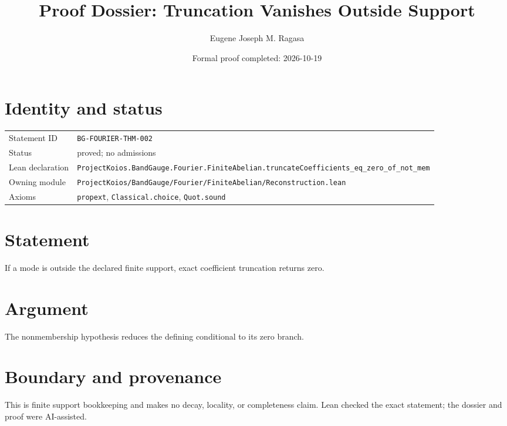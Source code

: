 \documentclass[11pt]{article}
\title{Proof Dossier: Truncation Vanishes Outside Support}
\author{Eugene Joseph M. Ragasa}
\date{Formal proof completed: 2026-10-19}
\begin{document}
\maketitle
\section{Identity and status}
\begin{tabularx}{\textwidth}{@{}lX@{}}\toprule
Statement ID & \texttt{BG-FOURIER-THM-002} \\
Status & proved; no admissions \\
Lean declaration & \texttt{ProjectKoios.BandGauge.Fourier.FiniteAbelian.}\newline\texttt{truncateCoefficients\_eq\_zero\_of\_not\_mem} \\
Owning module & \texttt{ProjectKoios/BandGauge/Fourier/FiniteAbelian/Reconstruction.lean} \\
Axioms & \texttt{propext}, \texttt{Classical.choice}, \texttt{Quot.sound} \\
\bottomrule\end{tabularx}
\section{Statement}
If a mode is outside the declared finite support, exact coefficient truncation returns zero.
\section{Argument}
The nonmembership hypothesis reduces the defining conditional to its zero branch.
\section{Boundary and provenance}
This is finite support bookkeeping and makes no decay, locality, or completeness claim. Lean checked the exact statement; the dossier and proof were AI-assisted.
\end{document}

